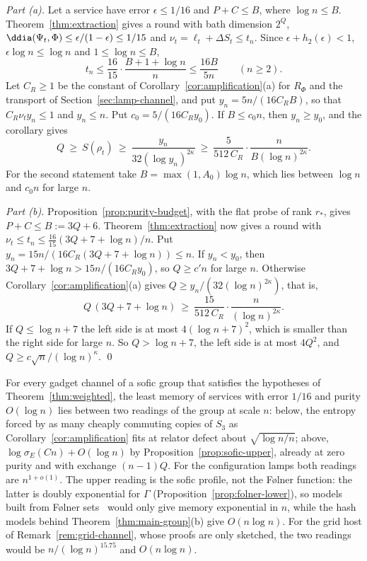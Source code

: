 \emph{Part (a).} Let a service have error $\epsilon\le1/16$ and $P+C\le B$, where $\log n\le B$. Theorem~\ref{thm:extraction} gives a round with
bath dimension $2^Q$, $\ddia(\Psi_t,\Phi)\le\epsilon/(1-\epsilon)\le1/15$ and $\nu_t=\ell_t+\Delta S_t\le t_n$. Since $\epsilon+h_2(\epsilon)<1$,
$\epsilon\log n\le\log n$ and $1\le\log n\le B$,
\[
t_n\le\frac{16}{15}\cdot\frac{B+1+\log n}{n}\le\frac{16B}{5n}\qquad(n\ge2).
\]
Let $C_R\ge1$ be the constant of Corollary~\ref{cor:amplification}(a) for $R_\Phi$ and the transport of Section~\ref{sec:lamp-channel}, and put
$y_n=5n/(16C_RB)$, so that $C_R\nu_ty_n\le1$ and $y_n\le n$. Put $c_0=5/(16C_Ry_0)$. If $B\le c_0n$, then $y_n\ge y_0$, and the corollary gives
\[
Q\ \ge\ S(\rho_t)\ \ge\ \frac{y_n}{32(\log y_n)^{2\kappa}}\ \ge\ \frac{5}{512\,C_R}\cdot\frac{n}{B(\log n)^{2\kappa}} .
\]
For the second statement take $B=\max(1,A_0)\log n$, which lies between $\log n$ and $c_0n$ for large $n$.

\emph{Part (b).} Proposition~\ref{prop:purity-budget}, with the flat probe of rank $r_*$, gives $P+C\le B:=3Q+6$. Theorem~\ref{thm:extraction} now
gives a round with $\nu_t\le t_n\le\frac{16}{15}(3Q+7+\log n)/n$. Put $y_n=15n/(16C_R(3Q+7+\log n))\le n$. If $y_n<y_0$, then
$3Q+7+\log n>15n/(16C_Ry_0)$, so $Q\ge c'n$ for large $n$. Otherwise Corollary~\ref{cor:amplification}(a) gives $Q\ge y_n/(32(\log n)^{2\kappa})$,
that is,
\[
Q\,(3Q+7+\log n)\ \ge\ \frac{15}{512\,C_R}\cdot\frac{n}{(\log n)^{2\kappa}} .
\]
If $Q\le\log n+7$ the left side is at most $4(\log n+7)^2$, which is smaller than the right side for large $n$. So $Q>\log n+7$, the left side is
at most $4Q^2$, and $Q\ge c\sqrt n/(\log n)^\kappa$. \qed

\begin{remark}\label{rem:sandwich}
For every gadget channel of a sofic group that satisfies the hypotheses of Theorem~\ref{thm:weighted}, the least memory of services with error
$1/16$ and purity $O(\log n)$ lies between two readings of the group at scale $n$: below, the entropy forced by as many cheaply commuting copies of
$S_3$ as Corollary~\ref{cor:amplification} fits at relator defect about $\sqrt{\log n/n}$; above, $\log\sigma_E(Cn)+O(\log n)$ by
Proposition~\ref{prop:sofic-upper}, already at zero purity and with exchange $(n-1)Q$. For the configuration lamps both readings are
$n^{1+o(1)}$. The upper reading is the sofic profile, not the F{\o}lner function: the latter is doubly exponential for $\Gamma$
(Proposition~\ref{prop:folner-lower}), so models built from F{\o}lner sets~\cite[Proposition~3.14]{Cornulier2013} would only give memory
exponential in $n$, while the hash models
behind Theorem~\ref{thm:main-group}(b) give $O(n\log n)$. For the grid host of Remark~\ref{rem:grid-channel}, whose proofs are only sketched, the two readings would be $n/(\log n)^{15.75}$ and
$O(n\log n)$.
\end{remark}

